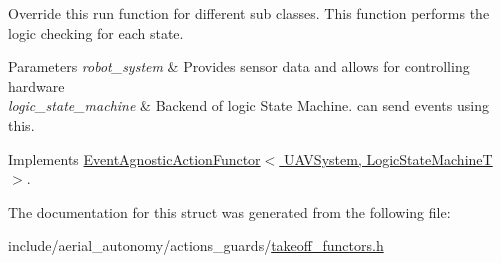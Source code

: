 Override this run function for different sub classes. This function performs the logic checking for each state. 


\begin{DoxyParams}{Parameters}
{\em robot\-\_\-system} & Provides sensor data and allows for controlling hardware \\
\hline
{\em logic\-\_\-state\-\_\-machine} & Backend of logic State Machine. can send events using this. \\
\hline
\end{DoxyParams}


Implements \hyperlink{structEventAgnosticActionFunctor_a53a48938d68370ff2ef262222565ffcf}{Event\-Agnostic\-Action\-Functor$<$ U\-A\-V\-System, Logic\-State\-Machine\-T $>$}.



The documentation for this struct was generated from the following file\-:\begin{DoxyCompactItemize}
\item 
include/aerial\-\_\-autonomy/actions\-\_\-guards/\hyperlink{takeoff__functors_8h}{takeoff\-\_\-functors.\-h}\end{DoxyCompactItemize}
